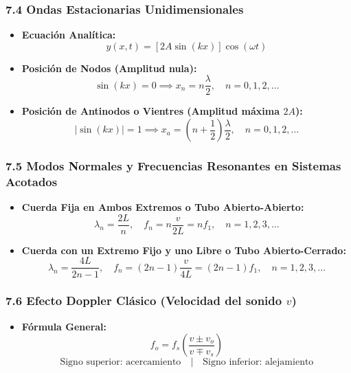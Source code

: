 \documentclass[11pt,a4paper]{article}
\begin{document}
\subsubsection*{7.4 Ondas Estacionarias Unidimensionales}

\begin{itemize}
  \item \textbf{Ecuación Analítica:}
  \[
    y(x, t) = [2A \sin(kx)] \cos(\omega t)
  \]
  \item \textbf{Posición de Nodos (Amplitud nula):}
  \[
    \sin(kx) = 0 \implies x_n = n \frac{\lambda}{2}, \quad n = 0, 1, 2, \dots
  \]
  \item \textbf{Posición de Antinodos o Vientres (Amplitud máxima $2A$):}
  \[
    |\sin(kx)| = 1 \implies x_a = \left( n + \frac{1}{2} \right) \frac{\lambda}{2}, \quad n = 0, 1, 2, \dots
  \]
\end{itemize}

\subsubsection*{7.5 Modos Normales y Frecuencias Resonantes en Sistemas Acotados}

\begin{itemize}
  \item \textbf{Cuerda Fija en Ambos Extremos o Tubo Abierto-Abierto:}
  \[
    \lambda_n = \frac{2L}{n}, \quad f_n = n \frac{v}{2L} = n f_1, \quad n = 1, 2, 3, \dots
  \]
  \item \textbf{Cuerda con un Extremo Fijo y uno Libre o Tubo Abierto-Cerrado:}
  \[
    \lambda_n = \frac{4L}{2n - 1}, \quad f_n = (2n - 1) \frac{v}{4L} = (2n - 1) f_1, \quad n = 1, 2, 3, \dots
  \]
\end{itemize}

\subsubsection*{7.6 Efecto Doppler Clásico (Velocidad del sonido $v$)}

\begin{itemize}
  \item \textbf{Fórmula General:}
  \[
    f_o = f_s \left( \frac{v \pm v_o}{v \mp v_s} \right)
  \]
  \[
    \text{Signo superior: acercamiento} \quad | \quad \text{Signo inferior: alejamiento}
  \]
\end{itemize}
\end{document}
